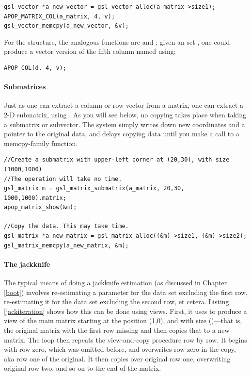 \begin{lstlisting}
gsl_vector *a_new_vector = gsl_vector_alloc(a_matrix->size1);
APOP_MATRIX_COL(a_matrix, 4, v);
gsl_vector_memcpy(a_new_vector, &v);
\end{lstlisting}

For the  structure, the analogous functions are
 and ; given an  set
, one could produce a vector version of the fifth column named  
using:
\begin{lstlisting}
APOP_COL(d, 4, v);
\end{lstlisting}


\paragraph{Submatrices} Just as one can extract a column or row
vector from a matrix, one can extract a 2-D submatrix, using
. As you will see below, no copying takes
place when taking a submatrix or subvector. The system simply writes
down new coordinates and a pointer to the original data, and delays
copying data until you make a call to a {\ci memcpy}-family function. 

\begin{lstlisting}
//Create a submatrix with upper-left corner at (20,30), with size (1000,1000)
//The operation will take no time.
gsl_matrix m = gsl_matrix_submatrix(a_matrix, 20,30, 1000,1000).matrix;
apop_matrix_show(&m);

//Copy the data. This may take time.
gsl_matrix *a_new_matrix = gsl_matrix_alloc((&m)->size1, (&m)->size2);
gsl_matrix_memcpy(a_new_matrix, &m);
\end{lstlisting}

\paragraph{The jackknife}
The typical means of doing a jackknife estimation (as discussed in
Chapter \ref{boot}) involves re-estimating a parameter for the data set
excluding the first row, re-estimating it for the data set excluding the
second row, et cetera.  Listing \ref{jackiteration}
shows how this can be done using views.  First, it uses
 to produce a view of the main matrix
starting at the position (1,0), and with size ()---that is, the original matrix with the first row missing
and then copies that to a new matrix. The  loop then repeats
the view-and-copy procedure row by row.  It begins with row zero, which
was omitted before, and overwrites row zero in the copy, aka row one of
the original. It then copies over original row one, overwriting original
row two, and so on to the end of the matrix.

